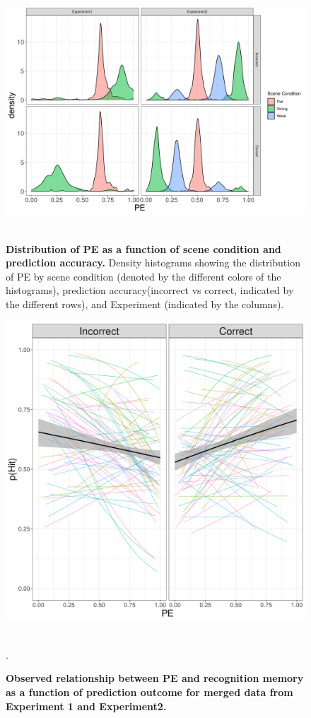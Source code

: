 \documentclass[a4paper,12pt]{article}
\begin{document}
\begin{figure}
{\includegraphics[width=1\textwidth]{figures/PE_byexp_byacc_byscene.png}}\
\caption{\textbf{Distribution of PE as a function of scene condition and prediction accuracy.} Density histograms showing the distribution of PE by scene condition (denoted by the different colors of the histograms), prediction accuracy(incorrect vs correct, indicated by the different rows), and Experiment (indicated by the columns). }
\label{fig:PE_SC:acc}

\end{figure}



\begin{figure}
{\includegraphics[width=1\textwidth]{figures/PE_mem_fLR_instr.exp1.exp2.png}}\
\caption{\textbf{Observed relationship between PE and recognition memory as a function of prediction outcome for merged data from Experiment 1 and Experiment2.}  }
\label{fig:PE_Mem_1_2}. 

\end{figure}
\end{document}
